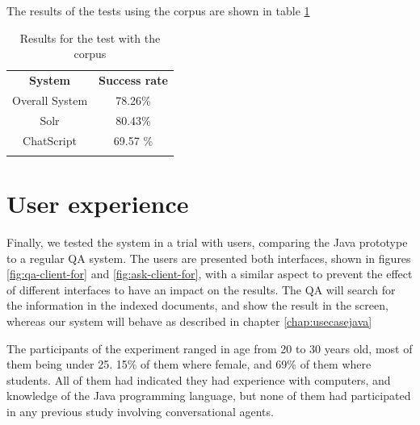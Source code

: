 The results of the tests using the corpus are shown in table \ref{tab:corpusresults}

\begin{table}
  \centering
  \begin{tabular*}{0.5\textwidth}{| c | c |}
    \hhline{|-|-|}
    \textbf{System} & \textbf{Success rate} \\ \hhline{|=|=|} 
    Overall System & 78.26\% \\ \hhline{|-|-|} 
    Solr & 80.43\% \\ \hhline{|-|-|} 
    ChatScript & 69.57 \% \\ \hhline{|-|-|} 
    \end{tabular*}
  \caption{Results for the test with the corpus}
  \label{tab:corpusresults}
\end{table}

\section{User experience}

Finally, we tested the system in a trial with users, comparing the Java prototype to a regular \ac{QA} system. The users are presented both interfaces, shown in figures \ref{fig:qa-client-for} and \ref{fig:ask-client-for}, with a similar aspect to prevent the effect of different interfaces to have an impact on the results. The \ac{QA} will search for the information in the indexed documents, and show the result in the screen, whereas our system will behave as described in chapter \ref{chap:usecasejava}

The participants of the experiment ranged in age from 20 to 30 years old, most of them being under 25. 15\% of them where female, and 69\% of them where students. All of them had indicated they had experience with computers, and knowledge of the Java programming language, but none of them had participated in any previous study involving conversational agents.

